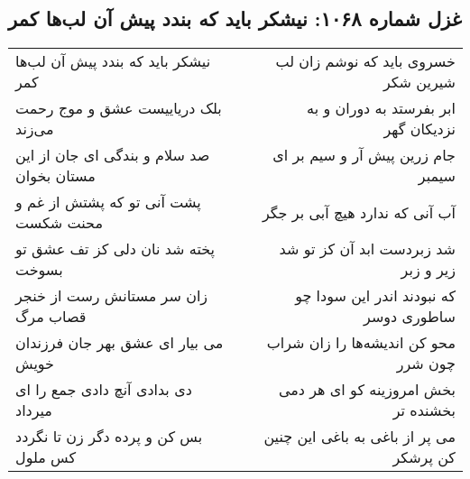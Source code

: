 \begin{center}
\section*{غزل شماره ۱۰۶۸: نیشکر باید که بندد پیش آن لب‌ها کمر}
\label{sec:1068}
\begin{longtable}{l p{0.5cm} r}
نیشکر باید که بندد پیش آن لب‌ها کمر
&&
خسروی باید که نوشم زان لب شیرین شکر
\\
بلک دریاییست عشق و موج رحمت می‌زند
&&
ابر بفرستد به دوران و به نزدیکان گهر
\\
صد سلام و بندگی ای جان از این مستان بخوان
&&
جام زرین پیش آر و سیم بر ای سیمبر
\\
پشت آنی تو که پشتش از غم و محنت شکست
&&
آب آنی که ندارد هیچ آبی بر جگر
\\
پخته شد نان دلی کز تف عشق تو بسوخت
&&
شد زبردست ابد آن کز تو شد زیر و زبر
\\
زان سر مستانش رست از خنجر قصاب مرگ
&&
که نبودند اندر این سودا چو ساطوری دوسر
\\
می بیار ای عشق بهر جان فرزندان خویش
&&
محو کن اندیشه‌ها را زان شراب چون شرر
\\
دی بدادی آنچ دادی جمع را ای میرداد
&&
بخش امروزینه کو ای هر دمی بخشنده تر
\\
بس کن و پرده دگر زن تا نگردد کس ملول
&&
می پر از باغی به باغی این چنین کن پرشکر
\\
\end{longtable}
\end{center}
